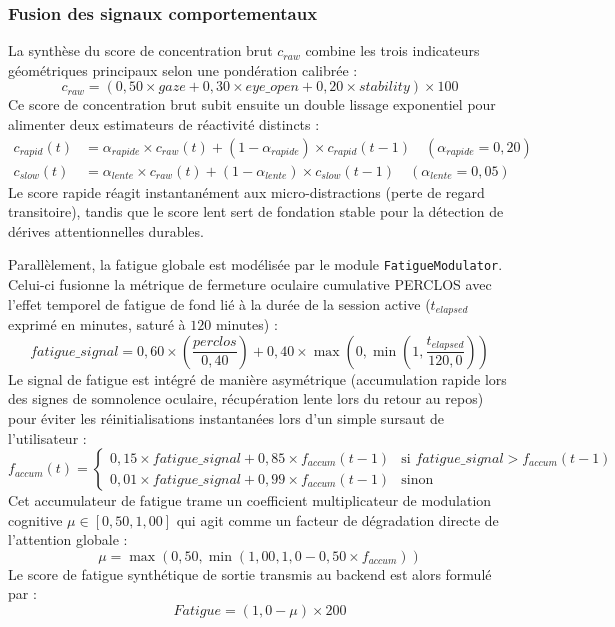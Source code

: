 \subsubsection{Fusion des signaux comportementaux}

La synthèse du score de concentration brut $c_{raw}$ combine les trois indicateurs géométriques principaux selon une pondération calibrée :
\begin{equation}
    c_{raw} = \left(0,50 \times gaze + 0,30 \times eye\_open + 0,20 \times stability\right) \times 100
\end{equation}
Ce score de concentration brut subit ensuite un double lissage exponentiel pour alimenter deux estimateurs de réactivité distincts :
\begin{align}
    c_{rapid}(t) &= \alpha_{rapide} \times c_{raw}(t) + (1 - \alpha_{rapide}) \times c_{rapid}(t-1) \quad (\alpha_{rapide} = 0,20) \\
    c_{slow}(t) &= \alpha_{lente} \times c_{raw}(t) + (1 - \alpha_{lente}) \times c_{slow}(t-1) \quad (\alpha_{lente} = 0,05)
\end{align}
Le score rapide réagit instantanément aux micro-distractions (perte de regard transitoire), tandis que le score lent sert de fondation stable pour la détection de dérives attentionnelles durables.

Parallèlement, la fatigue globale est modélisée par le module \texttt{FatigueModulator}. Celui-ci fusionne la métrique de fermeture oculaire cumulative PERCLOS avec l'effet temporel de fatigue de fond lié à la durée de la session active ($t_{elapsed}$ exprimé en minutes, saturé à $120$ minutes) :
\begin{equation}
    fatigue\_signal = 0,60 \times \left(\frac{perclos}{0,40}\right) + 0,40 \times \max\left(0, \min\left(1, \frac{t_{elapsed}}{120,0}\right)\right)
\end{equation}
Le signal de fatigue est intégré de manière asymétrique (accumulation rapide lors des signes de somnolence oculaire, récupération lente lors du retour au repos) pour éviter les réinitialisations instantanées lors d'un simple sursaut de l'utilisateur :
\begin{equation}
    f_{accum}(t) = \begin{cases} 
        0,15 \times fatigue\_signal + 0,85 \times f_{accum}(t-1) & \text{si } fatigue\_signal > f_{accum}(t-1) \\
        0,01 \times fatigue\_signal + 0,99 \times f_{accum}(t-1) & \text{sinon}
    \end{cases}
\end{equation}
Cet accumulateur de fatigue trame un coefficient multiplicateur de modulation cognitive $\mu \in [0,50, 1,00]$ qui agit comme un facteur de dégradation directe de l'attention globale :
\begin{equation}
    \mu = \max\left(0,50, \min\left(1,00, 1,0 - 0,50 \times f_{accum}\right)\right)
\end{equation}
Le score de fatigue synthétique de sortie transmis au backend est alors formulé par :
\begin{equation}
    Fatigue = (1,0 - \mu) \times 200
\end{equation}

